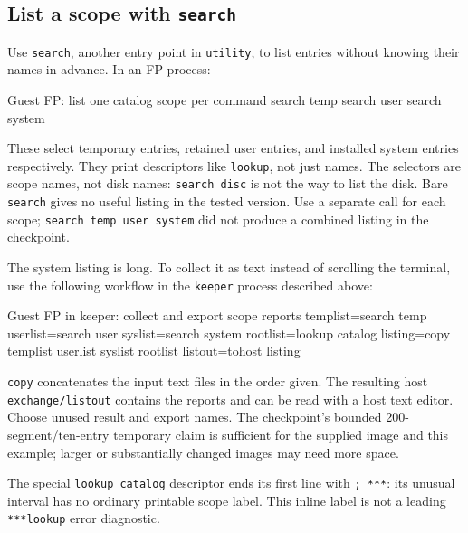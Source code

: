 \subsection{\texorpdfstring{List a scope with \texttt{search}}{List a scope with search}}\label{list-a-scope-with-search}

Use \passthrough{\lstinline!search!}, another entry point in \passthrough{\lstinline!utility!}, to list entries without knowing their names in advance. In an FP process:

\begin{commandexample}{Guest FP: list one catalog scope per command}
search temp
search user
search system
\end{commandexample}

These select temporary entries, retained user entries, and installed system entries respectively. They print descriptors like \passthrough{\lstinline!lookup!}, not just names. The selectors are scope names, not disk names: \passthrough{\lstinline!search disc!} is not the way to list the disk. Bare \passthrough{\lstinline!search!} gives no useful listing in the tested version. Use a separate call for each scope; \passthrough{\lstinline!search temp user system!} did not produce a combined listing in the checkpoint.

The system listing is long. To collect it as text instead of scrolling the terminal, use the following workflow in the \passthrough{\lstinline!keeper!} process described above:

\begin{commandexample}{Guest FP in keeper: collect and export scope reports}
templist=search temp
userlist=search user
syslist=search system
rootlist=lookup catalog
listing=copy templist userlist syslist rootlist
listout=tohost listing
\end{commandexample}

\passthrough{\lstinline!copy!} concatenates the input text files in the order given. The resulting host \passthrough{\lstinline!exchange/listout!} contains the reports and can be read with a host text editor. Choose unused result and export names. The checkpoint's bounded 200-segment/ten-entry temporary claim is sufficient for the supplied image and this example; larger or substantially changed images may need more space.

The special \texttt{lookup catalog} descriptor ends its first line with
\texttt{; ***}: its unusual interval has no ordinary printable scope label.
This inline label is not a leading \texttt{***lookup} error diagnostic.

